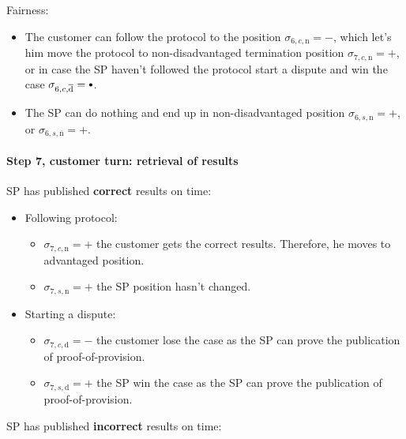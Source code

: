\documentclass{ieeeaccess}
\newcommand\sbullet[1][.75]{\mathbin{\ThisStyle{\vcenter{\hbox{%
  \scalebox{#1}{$\SavedStyle\bullet$}}}}}%
}
\begin{document}
Fairness:

\begin{itemize}

\item
  The customer can follow the protocol to the position
  \(\sigma_{6, c, \mathrm{n}} = -\), which let's him move the protocol
  to non-disadvantaged termination position
  \(\sigma_{7, c, \mathrm{n}} = +\), or in case the SP haven't followed
  the protocol start a dispute and win the case
  \(\sigma_{6, c, \overline{\mathrm{d}}} = \sbullet\).
\item
  The SP can do nothing and end up in non-disadvantaged position
  \(\sigma_{6, s, \mathrm{n}} = +\), or
  \(\sigma_{6, s, \overline{\mathrm{n}}} = +\).
\end{itemize}

\paragraph{Step 7, customer turn: retrieval of results}\label{step-7-retrieval-of-results}

SP has published \textbf{correct} results on time:

\begin{itemize}
\item
  Following protocol:

  \begin{itemize}
  
  \item
    \(\sigma_{7, c, \mathrm{n}} = +\) the customer gets the correct
    results. Therefore, he moves to advantaged position.
  \item
    \(\sigma_{7, s, \mathrm{n}} = +\) the SP position hasn't changed.
  \end{itemize}
\item
  Starting a dispute:

  \begin{itemize}
  
  \item
    \(\sigma_{7, c, \mathrm{d}} = -\) the customer lose the case as the
    SP can prove the publication of proof-of-provision.
  \item
    \(\sigma_{7, s, \mathrm{d}} = +\) the SP win the case as the SP can
    prove the publication of proof-of-provision.
  \end{itemize}
\end{itemize}

SP has published \textbf{incorrect} results on time:
\end{document}
